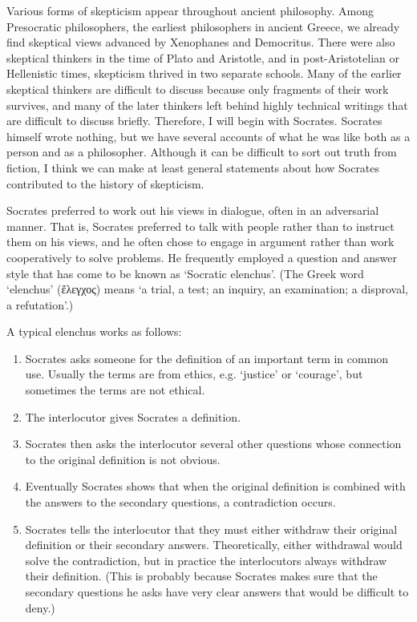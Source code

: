 Various forms of skepticism appear throughout ancient philosophy. Among Presocratic philosophers, the earliest philosophers in ancient Greece, we already find skeptical views advanced by Xenophanes and Democritus. There were also skeptical thinkers in the time of Plato and Aristotle, and in post-Aristotelian or Hellenistic times, skepticism thrived in two separate schools. Many of the earlier skeptical thinkers are difficult to discuss because only fragments of their work survives, and many of the later thinkers left behind highly technical writings that are difficult to discuss briefly. Therefore, I will begin with Socrates. Socrates himself wrote nothing, but we have several accounts of what he was like both as a person and as a philosopher. Although it can be difficult to sort out truth from fiction, I think we can make at least general statements about how Socrates contributed to the history of skepticism.

Socrates preferred to work out his views in dialogue, often in an adversarial manner. That is, Socrates preferred to talk with people rather than to instruct them on his views, and he often chose to engage in argument rather than work cooperatively to solve problems. He frequently employed a question and answer style that has come to be known as `Socratic elenchus'. (The Greek word `elenchus' (\textgreek{ἔλεγχος}) means `a trial, a test; an inquiry, an examination; a disproval, a refutation'.)

A typical elenchus works as follows:

\begin{enumerate}
    \item Socrates asks someone for the definition of an important term in common use. Usually the terms are from ethics, e.g. `justice' or `courage', but sometimes the terms are not ethical.
    \item The interlocutor gives Socrates a definition.
    \item Socrates then asks the interlocutor several other questions whose connection to the original definition is not obvious.
    \item Eventually Socrates shows that when the original definition is combined with the answers to the secondary questions, a contradiction occurs.
    \item Socrates tells the interlocutor that they must either withdraw their original definition or their secondary answers. Theoretically, either withdrawal would solve the contradiction, but in practice the interlocutors always withdraw their definition. (This is probably because Socrates makes sure that the secondary questions he asks have very clear answers that would be difficult to deny.)
\end{enumerate}

